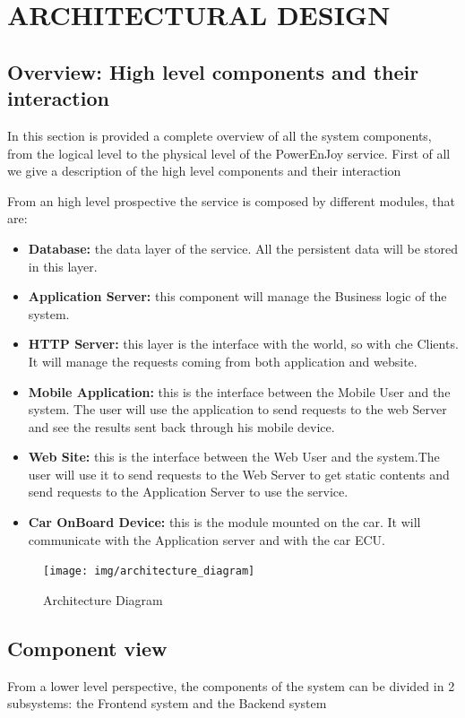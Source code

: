 \section{ARCHITECTURAL DESIGN}
\subsection{Overview: High level components and their interaction} 
In this section is provided a complete overview of all the system components, from the logical level to the physical level of the PowerEnJoy service. First of all we give a description of the high level components and their interaction\newline

\noindent From an high level prospective the service is composed by different modules, that are: \newline

\begin{itemize}
\item{\textbf{Database:}} the data layer of the service. All the persistent data will be stored in this layer.
\item{\textbf{Application Server:}} this component will manage the Business logic of the system.
\item{\textbf{HTTP Server:}} this layer is the interface with the world, so with che Clients. It will manage the requests coming from both application and website.
\item{\textbf{Mobile Application:}} this is the interface between the Mobile User and the system. The user will use the application to send requests to the web Server and see the results sent back through his mobile device. 
\item{\textbf{Web Site:}} this is the interface between the Web User and the system.The user will use it to send requests to the Web Server to get static contents and send requests to the Application Server to use the service.
\item{\textbf{Car OnBoard Device:}} this is the module mounted on the car. It will communicate with the Application server and with the car ECU.
\end{itemize}

	\begin{figure}[H]	
	\centering
	\texttt{[image: img/architecture\_diagram]}
	\caption{Architecture Diagram}
\end{figure}


\newpage
\subsection{Component view} 
From a lower level perspective, the components of the system can be divided in 2 subsystems: the Frontend system and the Backend system

